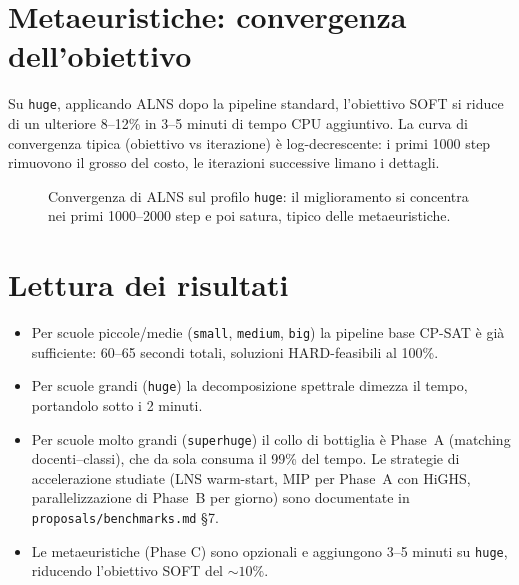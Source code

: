 \section{Metaeuristiche: convergenza dell'obiettivo}

Su \texttt{huge}, applicando ALNS dopo la pipeline standard,
l'obiettivo SOFT si riduce di un ulteriore 8--12\% in
3--5 minuti di tempo CPU aggiuntivo. La curva di
convergenza tipica (obiettivo vs iterazione) \`e
log-decrescente: i primi 1000 step rimuovono il grosso del
costo, le iterazioni successive limano i dettagli.

\begin{figure}[h]
\centering
{}
\caption{Convergenza di ALNS sul profilo \texttt{huge}: il
miglioramento si concentra nei primi 1000--2000 step e poi
satura, tipico delle metaeuristiche.}
\label{fig:bench-alns}
\end{figure}

\section{Lettura dei risultati}

\begin{ideabox}
\begin{itemize}
\item Per scuole piccole/medie (\texttt{small}, \texttt{medium},
  \texttt{big}) la pipeline base CP-SAT \`e gi\`a sufficiente:
  60--65 secondi totali, soluzioni HARD-feasibili al 100\%.
\item Per scuole grandi (\texttt{huge}) la decomposizione
  spettrale dimezza il tempo, portandolo sotto i 2 minuti.
\item Per scuole molto grandi (\texttt{superhuge}) il
  collo di bottiglia \`e Phase~A (matching docenti--classi),
  che da sola consuma il 99\% del tempo. Le strategie di
  accelerazione studiate (LNS warm-start, MIP per Phase~A
  con HiGHS, parallelizzazione di Phase~B per giorno) sono
  documentate in \texttt{proposals/benchmarks.md} \S7.
\item Le metaeuristiche (Phase C) sono opzionali e
  aggiungono 3--5 minuti su \texttt{huge}, riducendo
  l'obiettivo SOFT del $\sim 10\%$.
\end{itemize}
\end{ideabox}

